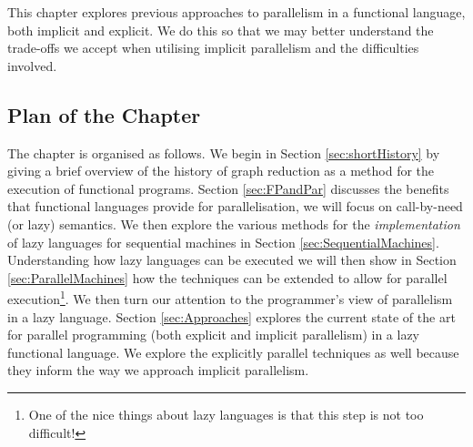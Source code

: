This chapter explores previous approaches to parallelism in a
functional language, both implicit and explicit. We do this so that
we may better understand the trade-offs we accept when utilising
implicit parallelism and the difficulties involved.

\subsection*{Plan of the Chapter}

The chapter is organised as follows. We begin in Section \ref{sec:shortHistory}
by giving a brief overview of the history of graph reduction as a method for
the execution of functional programs. Section \ref{sec:FPandPar} discusses the
benefits that functional languages provide for parallelisation, we will focus
on call-by-need (or lazy) semantics. We then explore the various methods for
the \emph{implementation} of lazy languages for sequential machines in Section
\ref{sec:SequentialMachines}. Understanding how lazy languages can be executed
we will then show in Section \ref{sec:ParallelMachines} how the techniques can
be extended to allow for parallel execution\footnote{One of the nice things
about lazy languages is that this step is not too difficult!}. We then turn our
attention to the programmer's view of parallelism in a lazy language. Section
\ref{sec:Approaches} explores the current state of the art for parallel
programming (both explicit and implicit parallelism) in a lazy functional
language. We explore the explicitly parallel techniques as well because they
inform the way we approach implicit parallelism.
